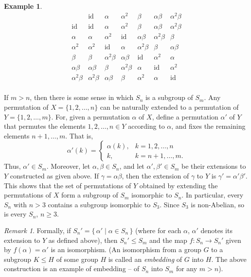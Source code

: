 \documentclass[svgnames]{article}
\theoremstyle{definition}
\newtheorem{Example}[Theorem]{Example}
\theoremstyle{remark}
\newtheorem*{Remark*}{Remark}
\newcommand{\id}{\mathrm{id}}
\begin{document}
\begin{appendices}
\begin{Example}
\begin{equation*}
\begin{array}{r|cccccc}
			&	\id			&	\alpha			&	\alpha^2	&	\beta	&	\alpha\beta		&	\alpha^2\beta	\\
\hline
	\id		&	\id			&	\alpha			&	\alpha^2	&	\beta	&	\alpha\beta		&	\alpha^2\beta	\\
	\alpha	&	\alpha		&	\alpha^2		&	\id		&	\alpha\beta	&	\alpha^2\beta	&	\beta	\\
	\alpha^2&	\alpha^2	&	\id				&	\alpha		&	\alpha^2\beta	&	\beta	&	\alpha\beta	\\
	\beta	&	\beta		&	\alpha^2\beta	&	\alpha\beta	&	\id		&	\alpha^2		&	\alpha	\\
\alpha\beta	&	\alpha\beta	&	\beta			&	\alpha^2\beta& \alpha	&	\id		&	\alpha^2 \\	
\alpha^2\beta&	\alpha^2\beta	&	\alpha\beta	&	\beta		&	\alpha^2	&	\alpha	&	\id \\
\end{array}
\end{equation*}
\end{Example}

If $m > n$, then there is some sense in which $S_n$ is a subgroup of $S_m$. Any permutation of $X = \{1, 2, \ldots, n\}$ can be naturally extended to a permutation of $Y = \{1, 2, \ldots, m\}$. For, given a permutation $\alpha$ of $X$, define a permutation $\alpha'$ of $Y$ that permutes the elements $1, 2, \ldots, n \in Y$ according to $\alpha$, and fixes the remaining elements $n + 1, \ldots, m$. That is,
\begin{equation*}
\alpha'(k) = \begin{cases}
\alpha(k), & k = 1, 2, \ldots, n\\
k,	&	k = n + 1, \ldots, m.
\end{cases}
\end{equation*}
Thus, $\alpha' \in S_m$. Moreover, let $\alpha, \beta \in S_n$, and let $\alpha', \beta'\in S_m$ be their extensions to $Y$ constructed as given above. If $\gamma = \alpha\beta$, then the extension of $\gamma$ to $Y$ is $\gamma' = \alpha'\beta'$. This shows that the set of permutations of $Y$ obtained by extending the permutations of $X$ form a subgroup of $S_m$ isomorphic to $S_n$. In particular, every $S_n$ with $n > 3$ contains a subgroup isomorphic to $S_3$. Since $S_3$ is non-Abelian, so is every $S_n$, $n \ge 3$.

\begin{Remark*}
Formally, if $S_n' = \{\, \alpha' \mid \alpha \in S_n \,\}$ (where for each $\alpha$, $\alpha'$ denotes its extension to $Y$ as defined above), then $S_n' \le S_m$ and the map $f \colon S_n \to S_n'$ given by $f(\alpha) = \alpha'$ is an isomorphism. {\small (An isomorphism from a group $G$ to a subgroup $K \le H$ of some group $H$ is called an \emph{embedding} of $G$ into $H$. The above construction is an example of embedding -- of $S_n$ into $S_m$ for any $m > n$)}.
\end{Remark*}


\end{appendices}
\end{document}
